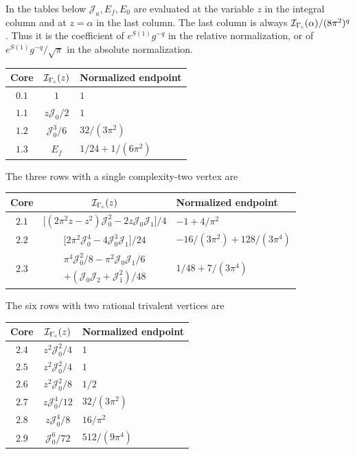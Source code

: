\documentclass[a4paper,10pt]{article}
\numberwithin{equation}{section}
\theoremstyle{paperplain}
\theoremstyle{paperremark}
\theoremstyle{paperplain}
\begin{document}
In the tables below $\mathcal J_a,E_f,E_0$ are evaluated at the
variable $z$ in the integral column and at $z=\alpha$ in the last
column. The last column is always
$\mathcal I_{\Gamma_{\rm c}}(\alpha)/(8\pi^2)^q$. Thus it is the
coefficient of $e^{S(1)}g^{-q}$ in the relative normalization, or of
$e^{S(1)}g^{-q}/\sqrt\pi$ in the absolute normalization.

\begin{center}
\begin{tabular}{ccl}
 Core&$\mathcal I_{\Gamma_{\rm c}}(z)$&Normalized endpoint\\[1mm]\hline
 \noalign{\smallskip}
 $0.1$&$1$&$1$\\[1mm]
 $1.1$&$z\mathcal J_0/2$&$1$\\[1mm]
 $1.2$&$\mathcal J_0^3/6$&$32/(3\pi^2)$\\[1mm]
 $1.3$&$E_f$&$1/24+1/(6\pi^2)$
\end{tabular}
\end{center}

The three rows with a single complexity-two vertex are
\begin{center}
\begin{tabular}{ccl}
 Core&$\mathcal I_{\Gamma_{\rm c}}(z)$&Normalized endpoint\\[1mm]\hline
 \noalign{\smallskip}
 $2.1$&$\bigl[(2\pi^2z-z^2)\mathcal J_0^2
                              -2z\mathcal J_0\mathcal J_1\bigr]/4$
 & $-1+4/\pi^2$\\[2mm]
 $2.2$&$\bigl[2\pi^2\mathcal J_0^4
                         -4\mathcal J_0^3\mathcal J_1\bigr]/24$
 & $-16/(3\pi^2)+128/(3\pi^4)$\\[2mm]
 $2.3$&$\begin{gathered}
 \pi^4\mathcal J_0^2/8-\pi^2\mathcal J_0\mathcal J_1/6\\
              +(\mathcal J_0\mathcal J_2+\mathcal J_1^2)/48
 \end{gathered}$
 & $1/48+7/(3\pi^4)$
\end{tabular}
\end{center}

The six rows with two rational trivalent vertices are
\begin{center}
\begin{tabular}{ccl}
 Core&$\mathcal I_{\Gamma_{\rm c}}(z)$&Normalized endpoint\\[1mm]\hline
 \noalign{\smallskip}
 $2.4$&$z^2\mathcal J_0^2/4$&$1$\\[1mm]
 $2.5$&$z^2\mathcal J_0^2/4$&$1$\\[1mm]
 $2.6$&$z^2\mathcal J_0^2/8$&$1/2$\\[1mm]
 $2.7$&$z\mathcal J_0^4/12$&$32/(3\pi^2)$\\[1mm]
 $2.8$&$z\mathcal J_0^4/8$&$16/\pi^2$\\[1mm]
 $2.9$&$\mathcal J_0^6/72$&$512/(9\pi^4)$
\end{tabular}
\end{center}
\end{document}
